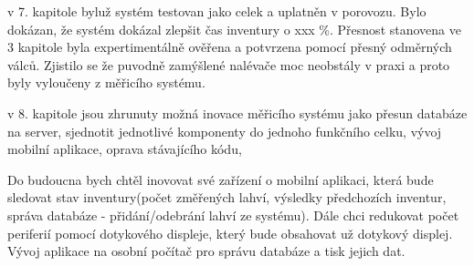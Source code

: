 v 7. kapitole byluž systém testovan jako celek a uplatněn v porovozu. Bylo dokázan, že systém dokázal zlepšit čas inventury o xxx \%. Přesnost stanovena ve 3 kapitole byla expertimentálně ověřena a potvrzena pomocí přesný odměrných válců. Zjistilo se že puvodně zamýšlené nalévače moc neobstály v praxi a proto byly vyloučeny z měřicího systému.

v 8. kapitole jsou zhrunuty možná inovace měřicího systému jako přesun databáze na server, sjednotit jednotlivé komponenty do jednoho funkčního celku, vývoj mobilní aplikace, oprava stávajícího kódu, 

Do budoucna bych chtěl inovovat své zařízení o mobilní aplikaci, která bude sledovat stav inventury(počet změřených lahví, výsledky předchozích inventur, správa databáze - přidání/odebrání lahví ze systému). Dále chci redukovat počet periferií pomocí dotykového displeje, který bude obsahovat už dotykový displej. Vývoj aplikace na osobní počítač pro správu databáze a tisk jejich dat. %









